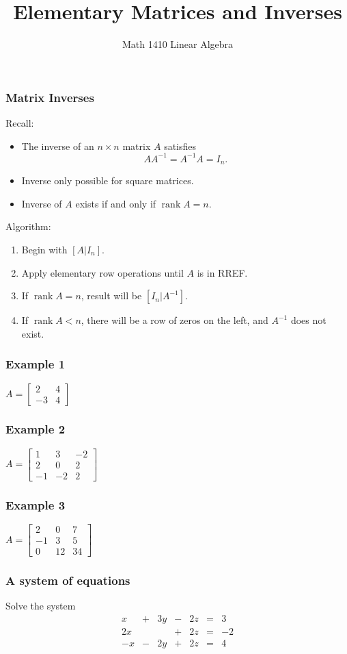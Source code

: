 \documentclass[11pt,t]{beamer}
\date{}
\author{Math 1410 Linear Algebra}
\title{Elementary Matrices and Inverses}
\DeclareMathOperator{\rank}{rank}
\begin{document}
\begin{frame}
\titlepage
\end{frame}

\begin{frame}\frametitle{Matrix Inverses}
Recall:
\begin{itemize}
\item The \alert{inverse} of an $n\times n$ matrix $A$ satisfies
\[
AA^{-1}=A^{-1}A = I_n.
\]
\item Inverse only possible for \alert{square} matrices.
\item Inverse of $A$ exists if and only if $\rank A = n$.
\end{itemize}
Algorithm:
\begin{enumerate}
\item Begin with $[A|I_n]$.
\item Apply elementary row operations until $A$ is in RREF.
\item If $\rank A=n$, result will be $[I_n|A^{-1}]$.
\item If $\rank A<n$, there will be a row of zeros on the left, and $A^{-1}$ does not exist.
\end{enumerate}
\end{frame}
\begin{frame}
\frametitle{Example 1}
$A = \begin{bmatrix}2&4\\-3&4\end{bmatrix}$

\end{frame}
\begin{frame}
\frametitle{Example 2}
$A = \begin{bmatrix}1&3&-2\\2&0&2\\-1&-2&2\end{bmatrix}$

\end{frame}
\begin{frame}
\frametitle{Example 3}
$A = \begin{bmatrix}2&0&7\\-1&3&5\\0&12&34\end{bmatrix}$
\end{frame}
\begin{frame}
\frametitle{A system of equations}
Solve the system 
\[
\begin{array}{ccccccc}
x&+&3y&-&2z&=&3\\
2x& & &+&2z&=&-2\\
-x&-&2y&+&2z&=&4
\end{array}
\]
\end{frame}
\end{document}
